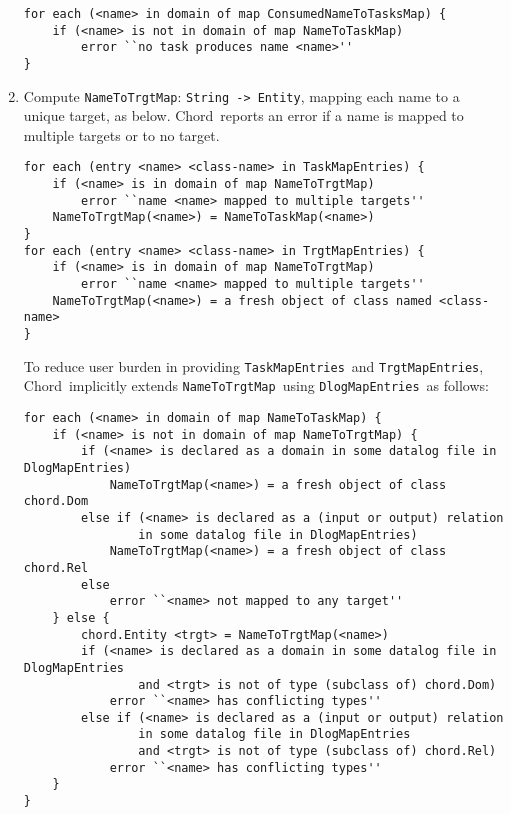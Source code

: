 \documentclass{article}
\providecommand\Chord{{Chord}}
\providecommand\NameToTrgtMap{{\tt NameToTrgtMap}}
\providecommand\TaskMapEntries{{\tt TaskMapEntries}}
\providecommand\TrgtMapEntries{{\tt TrgtMapEntries}}
\providecommand\DlogMapEntries{{\tt DlogMapEntries}}
\begin{document}
\begin{enumerate}
{\small 
\begin{verbatim}
for each (<name> in domain of map ConsumedNameToTasksMap) {
    if (<name> is not in domain of map NameToTaskMap)
        error ``no task produces name <name>''
}
\end{verbatim}
}

\item
Compute \NameToTrgtMap : {\tt String -> Entity},
mapping each name to a unique target, as below.
\Chord\ reports an error if a name is mapped to multiple targets
or to no target.

{\small 
\begin{verbatim}
for each (entry <name> <class-name> in TaskMapEntries) {
    if (<name> is in domain of map NameToTrgtMap)
        error ``name <name> mapped to multiple targets''
    NameToTrgtMap(<name>) = NameToTaskMap(<name>)
}
for each (entry <name> <class-name> in TrgtMapEntries) {
    if (<name> is in domain of map NameToTrgtMap)
        error ``name <name> mapped to multiple targets''
    NameToTrgtMap(<name>) = a fresh object of class named <class-name>
}
\end{verbatim}
}

To reduce user burden in providing \TaskMapEntries\ and
\TrgtMapEntries, \Chord\ implicitly extends \NameToTrgtMap\ using
\DlogMapEntries\ as follows:

{\small 
\begin{verbatim}
for each (<name> in domain of map NameToTaskMap) {
    if (<name> is not in domain of map NameToTrgtMap) {
        if (<name> is declared as a domain in some datalog file in DlogMapEntries)
            NameToTrgtMap(<name>) = a fresh object of class chord.Dom
        else if (<name> is declared as a (input or output) relation
                in some datalog file in DlogMapEntries)
            NameToTrgtMap(<name>) = a fresh object of class chord.Rel
        else
            error ``<name> not mapped to any target''
    } else {
        chord.Entity <trgt> = NameToTrgtMap(<name>)
        if (<name> is declared as a domain in some datalog file in DlogMapEntries
                and <trgt> is not of type (subclass of) chord.Dom)
            error ``<name> has conflicting types''
        else if (<name> is declared as a (input or output) relation
                in some datalog file in DlogMapEntries
                and <trgt> is not of type (subclass of) chord.Rel)
            error ``<name> has conflicting types''
    }
}
\end{verbatim}
}


\end{enumerate}
\end{document}
